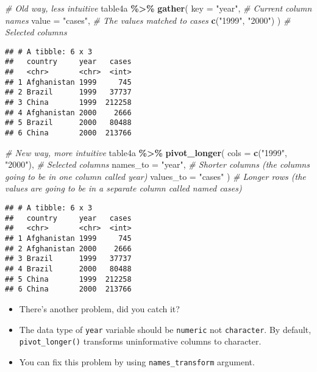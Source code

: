 \documentclass[
]{book}
\newenvironment{Shaded}{\begin{snugshade}}{\end{snugshade}}
\newcommand{\CommentTok}[1]{\textcolor[rgb]{0.56,0.35,0.01}{\textit{#1}}}
\newcommand{\DataTypeTok}[1]{\textcolor[rgb]{0.13,0.29,0.53}{#1}}
\newcommand{\KeywordTok}[1]{\textcolor[rgb]{0.13,0.29,0.53}{\textbf{#1}}}
\newcommand{\NormalTok}[1]{#1}
\newcommand{\OperatorTok}[1]{\textcolor[rgb]{0.81,0.36,0.00}{\textbf{#1}}}
\newcommand{\StringTok}[1]{\textcolor[rgb]{0.31,0.60,0.02}{#1}}
\begin{document}
\begin{Shaded}
\begin{Highlighting}[]
\CommentTok{\# Old way, less intuitive}
\NormalTok{table4a }\OperatorTok{\%\textgreater{}\%}
\StringTok{  }\KeywordTok{gather}\NormalTok{(}
    \DataTypeTok{key =} \StringTok{"year"}\NormalTok{, }\CommentTok{\# Current column names}
    \DataTypeTok{value =} \StringTok{"cases"}\NormalTok{, }\CommentTok{\# The values matched to cases}
    \KeywordTok{c}\NormalTok{(}\StringTok{"1999"}\NormalTok{, }\StringTok{"2000"}\NormalTok{)}
\NormalTok{  ) }\CommentTok{\# Selected columns}
\end{Highlighting}
\end{Shaded}

\begin{verbatim}
## # A tibble: 6 x 3
##   country     year   cases
##   <chr>       <chr>  <int>
## 1 Afghanistan 1999     745
## 2 Brazil      1999   37737
## 3 China       1999  212258
## 4 Afghanistan 2000    2666
## 5 Brazil      2000   80488
## 6 China       2000  213766
\end{verbatim}

\begin{Shaded}
\begin{Highlighting}[]
\CommentTok{\# New way, more intuitive}
\NormalTok{table4a }\OperatorTok{\%\textgreater{}\%}
\StringTok{  }\KeywordTok{pivot\_longer}\NormalTok{(}
    \DataTypeTok{cols =} \KeywordTok{c}\NormalTok{(}\StringTok{"1999"}\NormalTok{, }\StringTok{"2000"}\NormalTok{), }\CommentTok{\# Selected columns}
    \DataTypeTok{names\_to =} \StringTok{"year"}\NormalTok{, }\CommentTok{\# Shorter columns (the columns going to be in one column called year)}
    \DataTypeTok{values\_to =} \StringTok{"cases"}
\NormalTok{  ) }\CommentTok{\# Longer rows (the values are going to be in a separate column called named cases)}
\end{Highlighting}
\end{Shaded}

\begin{verbatim}
## # A tibble: 6 x 3
##   country     year   cases
##   <chr>       <chr>  <int>
## 1 Afghanistan 1999     745
## 2 Afghanistan 2000    2666
## 3 Brazil      1999   37737
## 4 Brazil      2000   80488
## 5 China       1999  212258
## 6 China       2000  213766
\end{verbatim}

\begin{itemize}
\item
  There's another problem, did you catch it?
\item
  The data type of \texttt{year} variable should be \texttt{numeric} not \texttt{character}. By default, \texttt{pivot\_longer()} transforms uninformative columns to character.
\item
  You can fix this problem by using \texttt{names\_transform} argument.
\end{itemize}
\end{document}
